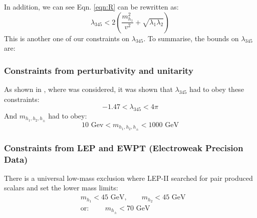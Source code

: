 \documentclass[12pt]{article}
\begin{document}
In addition, we can see Eqn. \ref{eqn:R} can be rewritten as:
\begin{equation}
    \lambda_{345} < 2\left( \frac{m_{h_1}^2}{v^2} + \sqrt{\lambda_1\lambda_2}\right)
\end{equation}
This is another one of our constraints on $\lambda_{345}$. To summarise, the bounds on $\lambda_{345}$ are: 

\subsubsection{Constraints from perturbativity and unitarity}
As shown in \cite{Belyaev:2016lok}, where \cite{Aruhrib2012Inert} was considered, it was shown that $\lambda_{345}$ had to obey these constraints:
\begin{equation}
    -1.47 < \lambda_{345} < 4\pi
    \label{eqn:l345_pert}
\end{equation}
And $m_{h_1, h_2, h_\pm}$ had to obey:
\begin{equation}
    10\text{ Gev} < m_{h_1, h_2, h_\pm} < 1000\text{ GeV}
    \label{eqn:masses_pert}
\end{equation}

\subsubsection{Constraints from LEP and EWPT (Electroweak Precision Data)}
There is a universal low-mass exclusion where LEP-II searched for pair produced scalars and set the lower mass limits:
\begin{equation}
    \begin{split}
        &m_{h_1} < 45  \text{ GeV}, \qquad m_{h_2} < 45 \text{ GeV}
         \\ &\text{or: } \qquad m_{h_\pm} <70 \text{ GeV}
    \end{split}
    \label{LEP-1}
\end{equation}
\end{document}
